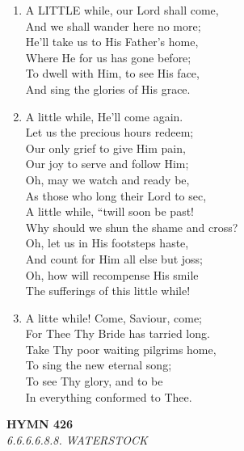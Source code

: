 \documentclass[11pt,a4paper]{article}
\begin{document}
\begin{enumerate}
    \item A LITTLE while, our Lord shall come, \\
        And we shall wander here no more; \\
        He'll take us to His Father's home, \\
        Where He for us has gone before; \\
        To dwell with Him, to see His face, \\
        And sing the glories of His grace.

    \item A little while, He'll come again. \\
        Let us the precious hours redeem; \\
        Our only grief to give Him pain, \\
        Our joy to serve and follow Him; \\
        Oh, may we watch and ready be, \\
        As those who long their Lord to sec, \\
        A little while, ``twill soon be past! \\
        Why should we shun the shame and cross? \\
        Oh, let us in His footsteps haste, \\
        And count for Him all else but joss; \\
        Oh, how will recompense His smile \\
        The sufferings of this little while!

    \item A litte while! Come, Saviour, come; \\
        For Thee Thy Bride has tarried long. \\
        Take Thy poor waiting pilgrims home, \\
        To sing the new eternal song; \\
        To see Thy glory, and to be \\
        In everything conformed to Thee.

\end{enumerate}

\newpage
\begin{center}
    {\Large \textbf{HYMN 426}}
    \\
    \textit{6.6.6.6.8.8. WATERSTOCK}
\end{center}
\vspace{1em}
\end{document}
